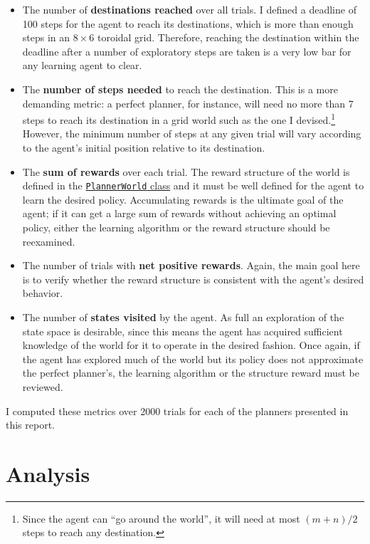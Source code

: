 \documentclass{article}
\begin{document}
\begin{itemize}
    \item The number of \textbf{destinations reached} over all trials. I defined a deadline of 100 steps for the agent to reach its destinations, which is more than enough steps in an $8\times6$ toroidal grid. Therefore, reaching the destination within the deadline after a number of exploratory steps are taken is a very low bar for any learning agent to clear.
    \item The \textbf{number of steps needed} to reach the destination. This is a more demanding metric: a perfect planner, for instance, will need no more than 7 steps to reach its destination in a grid world such as the one I devised.\footnote{Since the agent can ``go around the world'', it will need at most $(m+n)/2$ steps to reach any destination.} However, the minimum number of steps at any given trial will vary according to the agent's initial position relative to its destination.
    \item The \textbf{sum of rewards} over each trial. The reward structure of the world is defined in the \hyperref[sec:plannerworld]{\texttt{PlannerWorld} class} and it must be well defined for the agent to learn the desired policy. Accumulating rewards is the ultimate goal of the agent; if it can get a large sum of rewards without achieving an optimal policy, either the learning algorithm or the reward structure should be reexamined. 
    \item The number of trials with \textbf{net positive rewards}. Again, the main goal here is to verify whether the reward structure is consistent with the agent's desired behavior.
    \item The number of \textbf{states visited} by the agent. As full an exploration of the state space is desirable, since this means the agent has acquired sufficient knowledge of the world for it to operate in the desired fashion. Once again, if the agent has explored much of the world but its policy does not approximate the perfect planner's, the learning algorithm or the structure reward must be reviewed.
\end{itemize}

I computed these metrics over 2000 trials for each of the planners presented in this report.

\section{Analysis}
\end{document}
